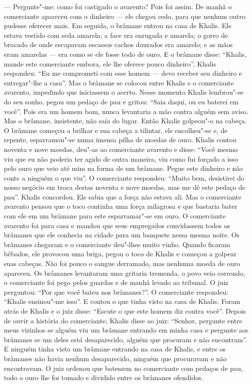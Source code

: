 --- Pergunte"-me: como foi castigado o avarento? Pois foi assim. De manhã
o comerciante apareceu com o dinheiro --- ele chegou cedo, para que
nenhum outro pudesse oferecer mais. Em seguida, o brâmane entrou na casa
de Khalis. Ele estava vestido com seda amarela; a face era enrugada e
amarela; o gorro de brocado de onde escapavam escassos cachos dourados
era amarelo; e as mãos eram amarelas --- era como se ele fosse todo de
ouro. E o brâmane disse: ``Khalis, mande este comerciante embora, ele
lhe oferece pouco dinheiro''. Khalis respondeu: ``Eu me comprometi com
esse homem --- devo receber seu dinheiro e entregar"-lhe a casa''. Mas o
brâmane se colocou entre Khalis e o comerciante avarento, impedindo que
iniciassem o acerto. Nesse momento Khalis lembrou"-se do seu sonho, pegou
um pedaço de pau e gritou: ``Saia daqui, ou eu baterei em você''. Pois
era um homem bom, nunca levantaria a mão contra alguém sem aviso. Mas o
brâmane, insistente, não saía do lugar. Então Khalis golpeou"-o na
cabeça. O brâmane começou a brilhar e sua cabeça a tilintar, ele
encolheu"-se e, de repente, esparramou"-se numa imensa pilha de moedas de
ouro. Khalis contou noventa e nove moedas, deu"-as ao comerciante
avarento e disse: ``Você mesmo viu que eu não poderia ter agido de outra
maneira, viu como fui forçado a isso pelo ouro que veio até mim na forma
de um brâmane. Pegue este dinheiro e não conte a ninguém o que viu''. O
comerciante respondeu: ``Muito bem, desistirei do nosso negócio em troca
destas noventa e nove moedas, mas me dê este pedaço de pau''. Khalis
concordou. Ele sabia que a força não estava ali. Mas o comerciante
avarento pensou que o toco continha uma força milagrosa e que bastaria
bater com ele em um brâmane para este esparramar"-se em ouro. O
comerciante avarento foi para casa e mandou que seus empregados
convidassem todos os brâmanes que ele conhecia na cidade para um
banquete nessa mesma noite. Os brâmanes chegaram e o comerciante
deu"-lhes muito vinho. Quando ficaram bêbados, ele provocou uma briga,
pegou o toco de Khalis e começou a golpear suas cabeças. Não foi pouco o
sangue derramado, mas nenhuma moeda de ouro apareceu. Os brâmanes
levantaram uma gritaria tremenda, o povo veio correndo, o comerciante
foi pego pelos guardas e de manhã levado ao tribunal. O juiz perguntou:
``Por que você bateu nos brâmanes?''. O comerciante respondeu: ``Khalis
ensinou"-me isso''. E contou o que tinha visto na casa de Khalis. Foram
atrás de Khalis e o juiz disse: ``Escute o que este homem diz contra
você''. Depois de ouvir a história do comerciante, Khalis disse ao juiz:
``Senhor, pergunte entre meus vizinhos se alguém viu um brâmane entrando
em minha casa e pergunte aos brâmanes se um deles está desaparecido,
alguém que procuram e não encontram''. E ninguém tinha visto um brâmane
entrando na casa de Khalis, e entre os brâmanes não havia nenhum
desaparecido, ninguém que procuravam e não encontravam. O juiz ordenou
que batessem no comerciante com pedaços de pau, todo o ouro lhe foi
tomado e dividido entre os brâmanes ofendidos.


